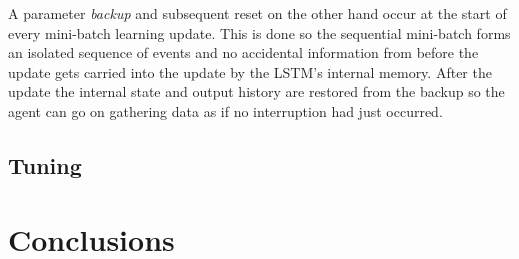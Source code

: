 A parameter \textit{backup} and subsequent reset
on the other hand
occur at the start of every mini-batch learning update.
This is done so the sequential mini-batch
forms an isolated sequence of events
and no accidental information from before the update gets carried into the update
by the LSTM's internal memory.
After the update
the internal state and output history
are restored from the backup
so the agent can go on gathering data
as if no interruption had just occurred.

\subsection{Tuning}
\label{sub:lstm_tuning}



\section{Conclusions}
\label{sec:conclusions}



